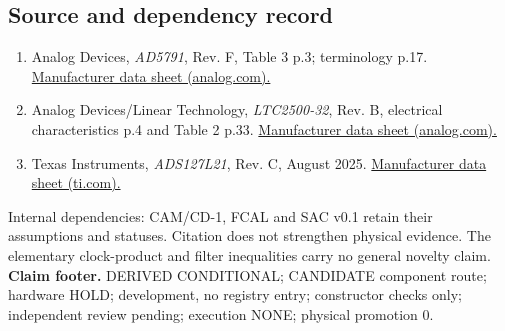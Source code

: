 \documentclass[10pt,a4paper]{article}
\begin{document}
\subsection*{Source and dependency record}
\begin{enumerate}[leftmargin=*,itemsep=3pt]
\item Analog Devices, \emph{AD5791}, Rev. F, Table 3 p.3; terminology p.17.
\href{https://www.analog.com/media/en/technical-documentation/data-sheets/AD5791.pdf}{Manufacturer data sheet (analog.com).}
\item Analog Devices/Linear Technology, \emph{LTC2500-32}, Rev. B, electrical characteristics p.4 and Table 2 p.33.
\href{https://www.analog.com/media/en/technical-documentation/data-sheets/250032fb.pdf}{Manufacturer data sheet (analog.com).}
\item Texas Instruments, \emph{ADS127L21}, Rev. C, August 2025.
\href{https://www.ti.com/lit/ds/symlink/ads127l21.pdf}{Manufacturer data sheet (ti.com).}
\end{enumerate}
Internal dependencies: CAM/CD-1, FCAL and SAC v0.1 retain their assumptions and statuses. Citation does not strengthen physical evidence. The elementary clock-product and filter inequalities carry no general novelty claim.
\vfill\noindent\textbf{Claim footer.} DERIVED CONDITIONAL; CANDIDATE component route; hardware HOLD; development, no registry entry; constructor checks only; independent review pending; execution NONE; physical promotion 0.
\end{document}
